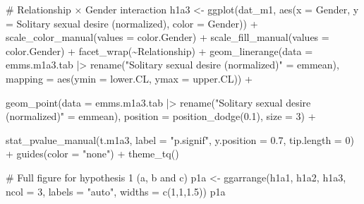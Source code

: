\documentclass[
  bookmarksnumbered]{article}
\newenvironment{Shaded}{\begin{snugshade}}{\end{snugshade}}
\newcommand{\AttributeTok}[1]{\textcolor[rgb]{0.80,0.80,0.80}{#1}}
\newcommand{\CommentTok}[1]{\textcolor[rgb]{0.50,0.62,0.50}{#1}}
\newcommand{\DecValTok}[1]{\textcolor[rgb]{0.86,0.86,0.80}{#1}}
\newcommand{\FloatTok}[1]{\textcolor[rgb]{0.75,0.75,0.82}{#1}}
\newcommand{\FunctionTok}[1]{\textcolor[rgb]{0.94,0.94,0.56}{#1}}
\newcommand{\NormalTok}[1]{\textcolor[rgb]{0.80,0.80,0.80}{#1}}
\newcommand{\OtherTok}[1]{\textcolor[rgb]{0.94,0.94,0.56}{#1}}
\newcommand{\SpecialCharTok}[1]{\textcolor[rgb]{0.86,0.64,0.64}{#1}}
\newcommand{\StringTok}[1]{\textcolor[rgb]{0.80,0.58,0.58}{#1}}
\begin{document}
\begin{Shaded}
\begin{Highlighting}[]
\CommentTok{\# Relationship × Gender interaction}
\NormalTok{h1a3 }\OtherTok{\textless{}{-}} \FunctionTok{ggplot}\NormalTok{(dat\_m1, }\FunctionTok{aes}\NormalTok{(}\AttributeTok{x =}\NormalTok{ Gender, }\AttributeTok{y =} \StringTok{\textasciigrave{}}\AttributeTok{Solitary sexual desire (normalized)}\StringTok{\textasciigrave{}}\NormalTok{, }
                           \AttributeTok{color =}\NormalTok{ Gender)) }\SpecialCharTok{+}
  \FunctionTok{scale\_color\_manual}\NormalTok{(}\AttributeTok{values =}\NormalTok{ color.Gender) }\SpecialCharTok{+}
  \FunctionTok{scale\_fill\_manual}\NormalTok{(}\AttributeTok{values =}\NormalTok{ color.Gender) }\SpecialCharTok{+}
  \FunctionTok{facet\_wrap}\NormalTok{(}\SpecialCharTok{\textasciitilde{}}\NormalTok{Relationship) }\SpecialCharTok{+}
  \FunctionTok{geom\_linerange}\NormalTok{(}\AttributeTok{data =}\NormalTok{ emms.m1a3.tab }\SpecialCharTok{|\textgreater{}} 
                  \FunctionTok{rename}\NormalTok{(}\StringTok{"Solitary sexual desire (normalized)"} \OtherTok{=}\NormalTok{ emmean), }
                \AttributeTok{mapping =} \FunctionTok{aes}\NormalTok{(}\AttributeTok{ymin =}\NormalTok{ lower.CL, }\AttributeTok{ymax =}\NormalTok{ upper.CL)) }\SpecialCharTok{+}
                
  \FunctionTok{geom\_point}\NormalTok{(}\AttributeTok{data =}\NormalTok{ emms.m1a3.tab }\SpecialCharTok{|\textgreater{}} 
                  \FunctionTok{rename}\NormalTok{(}\StringTok{"Solitary sexual desire (normalized)"} \OtherTok{=}\NormalTok{ emmean), }
             \AttributeTok{position =} \FunctionTok{position\_dodge}\NormalTok{(}\FloatTok{0.1}\NormalTok{), }
             \AttributeTok{size =} \DecValTok{3}\NormalTok{) }\SpecialCharTok{+}
             
  \FunctionTok{stat\_pvalue\_manual}\NormalTok{(t.m1a3, }
                     \AttributeTok{label =} \StringTok{"p.signif"}\NormalTok{, }
                     \AttributeTok{y.position =} \FloatTok{0.7}\NormalTok{, }
                     \AttributeTok{tip.length =} \DecValTok{0}\NormalTok{) }\SpecialCharTok{+}
  \FunctionTok{guides}\NormalTok{(}\AttributeTok{color =} \StringTok{"none"}\NormalTok{) }\SpecialCharTok{+}
  \FunctionTok{theme\_tq}\NormalTok{()}

\CommentTok{\# Full figure for hypothesis 1 (a, b and c)}
\NormalTok{p1a }\OtherTok{\textless{}{-}} \FunctionTok{ggarrange}\NormalTok{(h1a1, h1a2, h1a3,}
                 \AttributeTok{ncol =} \DecValTok{3}\NormalTok{,}
                 \AttributeTok{labels =} \StringTok{"auto"}\NormalTok{,}
                 \AttributeTok{widths =} \FunctionTok{c}\NormalTok{(}\DecValTok{1}\NormalTok{,}\DecValTok{1}\NormalTok{,}\FloatTok{1.5}\NormalTok{))}
\NormalTok{p1a}
\end{Highlighting}
\end{Shaded}
\end{document}
